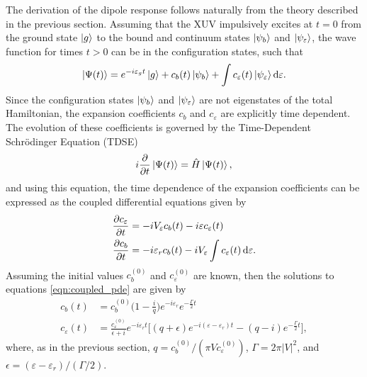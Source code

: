 The derivation of the dipole response follows naturally from the theory described in the previous section. Assuming that the XUV impulsively excites at $t=0$ from the ground state $\ket{g}$ to the bound and continuum states $\ket{\psi_b}$ and $\ket{\psi_\varepsilon}$, the wave function for times $t>0$ can be in the configuration states, such that
\begin{equation}
\label{eqn:wvfnc_expansion}
	\ket{\Psi(t)}=e^{-i\varepsilon_gt}\ket{g}+c_b(t)\ket{\psi_b}+\int c_\varepsilon(t)\ket{\psi_\varepsilon}\mathop{}\!\mathrm{d} \varepsilon.
\end{equation}
Since the configuration states $\ket{\psi_b}$ and $\ket{\psi_\varepsilon}$ are not eigenstates of the total Hamiltonian, the expansion coefficients $c_b$ and $c_\varepsilon$ are explicitly time dependent. The evolution of these coefficients is governed by the Time-Dependent Schr{\"o}dinger Equation (TDSE)
\begin{equation}
\label{eqn:tdse}
	i\frac{\partial}{\partial t}\ket{\Psi(t)}=\hat{H}\ket{\Psi(t)},
\end{equation}
and using this equation, the time dependence of the expansion coefficients can be expressed as the coupled differential equations given by
\begin{equation}
\label{eqn:coupled_pde}
	\begin{aligned}
		\frac{\partial c_{\varepsilon}}{\partial t} &= -iV_\varepsilon c_b(t)-i\varepsilon c_\varepsilon(t)\\
		\frac{\partial c_b}{\partial t} &= -i\varepsilon_r c_b(t)-iV_\varepsilon \int c_\varepsilon(t) \mathop{}\!\mathrm{d} \varepsilon.
	\end{aligned}
\end{equation}
Assuming the initial values $c_b^{(0)}$ and $c_\varepsilon^{(0)}$ are known, then the solutions to equations \ref{eqn:coupled_pde} are given by
\begin{equation}
\label{eqn:coefficients}
	\begin{aligned}
		c_b(t) &= c_b^{(0)}\bigg(1-\frac{i}{q}\bigg)e^{-i\varepsilon_r}e^{-\frac{\Gamma}{2}t}\\
		c_\varepsilon(t) &= \frac{c_\varepsilon^{(0)}}{\epsilon + i}e^{-i\varepsilon_r t}\bigg[ (q+\epsilon)e^{-i(\varepsilon-\varepsilon_r)t}-(q-i)e^{-\frac{\Gamma}{2}t}\bigg],
	\end{aligned}
\end{equation}
where, as in the previous section, $q=c_b^{(0)}/(\pi V c_\varepsilon^{(0)})$, $\Gamma=2\pi\rvert V \lvert^2$, and $\epsilon=(\varepsilon-\varepsilon_r)/(\Gamma/2)$. 



